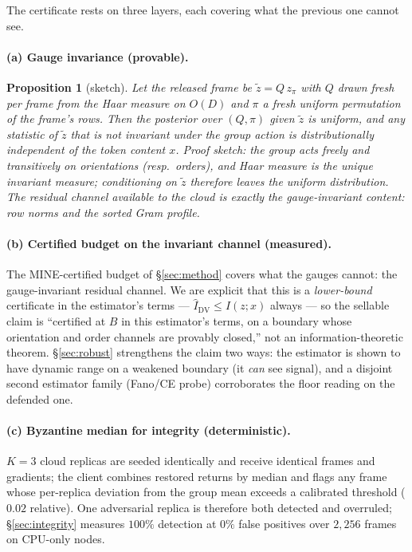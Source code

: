 \documentclass[10pt]{article}
\newtheorem{proposition}{Proposition}
\newcommand{\Ihat}{\hat{I}}
\begin{document}
The certificate rests on three layers, each covering what the previous
one cannot see.

\paragraph{(a) Gauge invariance (provable).}
\begin{proposition}[sketch]
Let the released frame be $\tilde z = Q\,z_{\pi}$ with $Q$ drawn fresh per
frame from the Haar measure on $O(D)$ and $\pi$ a fresh uniform
permutation of the frame's rows.  Then the posterior over $(Q,\pi)$ given
$\tilde z$ is uniform, and any statistic of $\tilde z$ that is not
invariant under the group action is distributionally independent of the
token content $x$.  \emph{Proof sketch:} the group acts freely and
transitively on orientations (resp.\ orders), and Haar measure is the
unique invariant measure; conditioning on $\tilde z$ therefore leaves the
uniform distribution.  The residual channel available to the cloud is
exactly the gauge-invariant content: row norms and the sorted Gram
profile.
\end{proposition}

\paragraph{(b) Certified budget on the invariant channel (measured).}
The MINE-certified budget of \S\ref{sec:method} covers what the gauges
cannot: the gauge-invariant residual channel.  We are explicit that this
is a \emph{lower-bound} certificate in the estimator's terms —
$\Ihat_{\mathrm{DV}} \le I(z;x)$ always — so the sellable claim is
``certified at $B$ in this estimator's terms, on a boundary whose
orientation and order channels are provably closed,'' not an
information-theoretic theorem.  \S\ref{sec:robust} strengthens the claim
two ways: the estimator is shown to have dynamic range on a weakened
boundary (it \emph{can} see signal), and a disjoint second estimator
family (Fano/CE probe) corroborates the floor reading on the defended
one.

\paragraph{(c) Byzantine median for integrity (deterministic).}
$K{=}3$ cloud replicas are seeded identically and receive identical
frames and gradients; the client combines restored returns by median and
flags any frame whose per-replica deviation from the group mean exceeds a
calibrated threshold ($0.02$ relative).  One adversarial replica is
therefore both detected and overruled; \S\ref{sec:integrity} measures
$100\%$ detection at $0\%$ false positives over $2{,}256$ frames on
CPU-only nodes.
\end{document}
